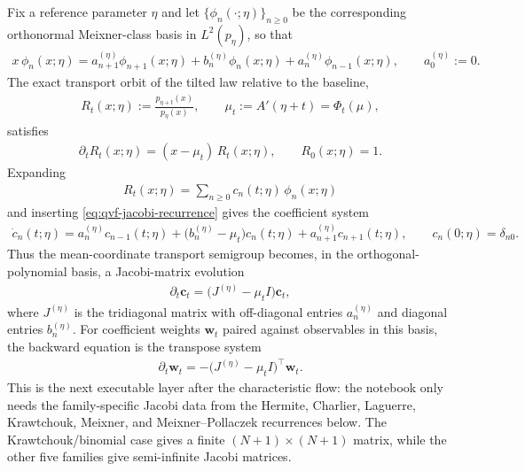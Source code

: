 \documentclass[a4paper,11pt]{article}
\numberwithin{equation}{section}
\theoremstyle{plain}
\theoremstyle{definition}
\theoremstyle{remark}
\newcommand{\1}{\ensuremath{\mathds{1}}\xspace}
\begin{document}
Fix a reference parameter $\eta$ and let $\{\phi_n(\cdot;\eta)\}_{n\ge0}$ be the corresponding orthonormal Meixner-class basis in $L^2(p_\eta)$, so that
\begin{align}
x\,\phi_n(x;\eta)
=a_{n+1}^{(\eta)}\phi_{n+1}(x;\eta)+b_n^{(\eta)}\phi_n(x;\eta)+a_n^{(\eta)}\phi_{n-1}(x;\eta),
\qquad
a_0^{(\eta)}:=0.
\label{eq:qvf-jacobi-recurrence}
\end{align}
The exact transport orbit of the tilted law relative to the baseline,
\begin{align}
R_t(x;\eta):=\frac{p_{\eta+t}(x)}{p_\eta(x)},
\qquad
\mu_t:=A'(\eta+t)=\Phi_t(\mu),
\label{eq:qvf-ratio-transport}
\end{align}
satisfies
\begin{align}
\partial_t R_t(x;\eta)=(x-\mu_t)\,R_t(x;\eta),
\qquad
R_0(x;\eta)=1.
\label{eq:qvf-ratio-evolution}
\end{align}
Expanding
\begin{align}
R_t(x;\eta)=\sum_{n\ge0}c_n(t;\eta)\,\phi_n(x;\eta)
\label{eq:qvf-ratio-basis-expansion}
\end{align}
and inserting \eqref{eq:qvf-jacobi-recurrence} gives the coefficient system
\begin{align}
\dot c_n(t;\eta)
=a_n^{(\eta)}c_{n-1}(t;\eta)
+\big(b_n^{(\eta)}-\mu_t\big)c_n(t;\eta)
+a_{n+1}^{(\eta)}c_{n+1}(t;\eta),
\qquad
c_n(0;\eta)=\delta_{n0}.
\label{eq:qvf-coefficient-transport}
\end{align}
Thus the mean-coordinate transport semigroup becomes, in the orthogonal-polynomial basis, a Jacobi-matrix evolution
\begin{align}
\partial_t \mathbf c_t=\big(J^{(\eta)}-\mu_t I\big)\mathbf c_t,
\label{eq:qvf-jacobi-semigroup}
\end{align}
where $J^{(\eta)}$ is the tridiagonal matrix with off-diagonal entries $a_n^{(\eta)}$ and diagonal entries $b_n^{(\eta)}$.
For coefficient weights $\mathbf w_t$ paired against observables in this basis, the backward equation is the transpose system
\begin{align}
\partial_t \mathbf w_t=-\big(J^{(\eta)}-\mu_t I\big)^\top\mathbf w_t.
\label{eq:qvf-jacobi-adjoint}
\end{align}
This is the next executable layer after the characteristic flow: the notebook only needs the family-specific Jacobi data from the Hermite, Charlier, Laguerre, Krawtchouk, Meixner, and Meixner--Pollaczek recurrences below. The Krawtchouk/binomial case gives a finite $(N+1)\times(N+1)$ matrix, while the other five families give semi-infinite Jacobi matrices.
\end{document}
